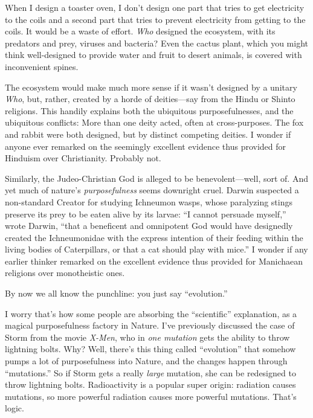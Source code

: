 {
 When I design a toaster oven, I don't design one
part that tries to get electricity to the coils and a second part that
tries to prevent electricity from getting to the coils. It would be a
waste of effort. \textit{Who} designed the ecosystem, with its
predators and prey, viruses and bacteria? Even the cactus plant, which
you might think well-designed to provide water and fruit to desert
animals, is covered with inconvenient spines.}

{
 The ecosystem would make much more sense if it
wasn't designed by a unitary \textit{Who}, but, rather,
created by a horde of deities---say from the Hindu or Shinto religions.
This handily explains both the ubiquitous purposefulnesses, and the
ubiquitous conflicts: More than one deity acted, often at
cross-purposes. The fox and rabbit were both designed, but by distinct
competing deities. I wonder if anyone ever remarked on the seemingly
excellent evidence thus provided for Hinduism over Christianity.
Probably not.}

{
 Similarly, the Judeo-Christian God is alleged to be
benevolent---well, sort of. And yet much of nature's
\textit{purposefulness} seems downright cruel. Darwin suspected a
non-standard Creator for studying Ichneumon wasps, whose paralyzing
stings preserve its prey to be eaten alive by its larvae:
``I cannot persuade myself,'' wrote
Darwin, ``that a beneficent and omnipotent God would
have designedly created the Ichneumonidae with the express intention of
their feeding within the living bodies of Caterpillars, or that a cat
should play with mice.'' I wonder
if any earlier thinker remarked on the excellent evidence thus provided
for Manichaean religions over monotheistic ones.}

{
 By now we all know the punchline: you just say
``evolution.''}

{
 I worry that's how some people are absorbing the
``scientific'' explanation, as a
magical purposefulness factory in Nature. I've
previously discussed the case of Storm from the movie \textit{X-Men},
who in \textit{one mutation} gets the ability to throw lightning bolts.
Why? Well, there's this thing called
``evolution'' that somehow pumps a
lot of purposefulness into Nature, and the changes happen through
``mutations.'' So if Storm gets a
really \textit{large} mutation, she can be redesigned to throw
lightning bolts. Radioactivity is a popular super origin: radiation
causes mutations, so more powerful radiation causes more powerful
mutations. That's logic.}

